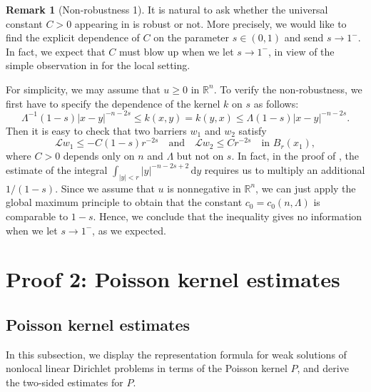 \documentclass[11pt]{amsart}
\theoremstyle{plain}
\theoremstyle{definition}
\newtheorem{remark}[theorem]{Remark}
\numberwithin{equation}{section}
\begin{document}
\begin{remark}[Non-robustness 1]\label{rmk-robust1}
    It is natural to ask whether the universal constant $C>0$ appearing in  is robust or not. More precisely, we would like to find the explicit dependence of $C$ on the parameter $s \in (0,1)$ and send $s \to 1^{-}$. In fact, we expect that $C$ must blow up when we let $s \to 1^-$, in view of the simple observation in  for the local setting.
    
    For simplicity, we may assume that $u \geq 0$ in $\mathbb{R}^n$. To verify the non-robustness, we first have to specify the dependence of the kernel $k$ on $s$ as follows:
    \begin{equation*}
        \Lambda^{-1}(1-s) |x-y|^{-n-2s} \leq k(x, y)=k(y, x) \leq \Lambda (1-s)|x-y|^{-n-2s}.
    \end{equation*}
    Then it is easy to check that two barriers $w_1$ and $w_2$ satisfy
    \begin{equation*}
        \mathcal{L}w_1 \leq -C(1-s)r^{-2s} \quad \text{and} \quad \mathcal{L}w_2 \leq Cr^{-2s} \quad \text{in $B_r(x_1)$},
    \end{equation*}
    where $C>0$ depends only on $n$ and $\Lambda$ but not on $s$. In fact, in the proof of , the estimate of the integral $\int_{|y|<r}|y|^{-n-2s+2}\,\mathrm{d}y$ requires us to multiply an additional $1/(1-s)$. Since we assume that $u$ is nonnegative in $\mathbb{R}^n$, we can just apply the global maximum principle to obtain that the constant $c_0=c_0(n, \Lambda)$ is comparable to $1-s$. Hence, we conclude that the inequality gives no information when we let $s \to 1^-$, as we expected.
\end{remark}




\section{Proof 2: Poisson kernel estimates}\label{sec-harnack-poisson}
\subsection{Poisson kernel estimates}\label{sec-poisson}
In this subsection, we display the representation formula for weak solutions of nonlocal linear Dirichlet problems in terms of the Poisson kernel $P$, and derive the two-sided estimates for $P$.
\end{document}
